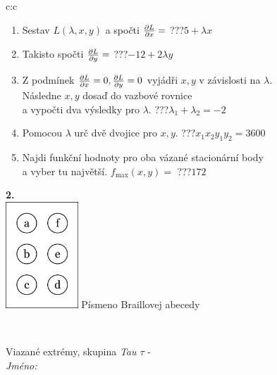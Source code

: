 \documentclass[10pt]{report}
\begin{document}
\begin{tabular}{c:c}
\begin{minipage}[c][104.5mm][t]{0.5\linewidth}
\begin{center}
\begin{minipage}{0.79\linewidth}
\begin{center}
\begin{varwidth}{\linewidth}
\begin{enumerate}
\item Sestav $L(\lambda,x,y)$ a spočti $\pdv{L}{x}=$\quad \dotfill\; ???\;\dotfill \quad $5+\lambda x$
\item Takisto spočti $\pdv{L}{y}=$\quad \dotfill\; ???\;\dotfill \quad $-12+2\lambda y$
\item Z podmínek $\pdv{L}{x}=0 , \pdv{L}{y}=0$ vyjádři $x,y$ v závislosti na $\lambda$.\\ \phantom{xxxxxx}Následne $x,y$ dosaď do vazbové rovnice\\ \phantom{xxxxxx}a vypočti dva výsledky pro $\lambda$.\quad \dotfill\; ???\;\dotfill \quad $\lambda_1+\lambda_2=-2$
\item Pomocou $\lambda$ urč dvě dvojice pro $x,y$.\quad \dotfill\; ???\;\dotfill \quad $x_1 x_2 y_1 y_2=3600$
\item Najdi funkční hodnoty pro oba vázané stacionární body\\ \phantom{xxxxxx}a vyber tu najvětší. $f_{\text{max}}(x,y)=$\quad \dotfill\; ???\;\dotfill \quad $172$
\end{enumerate}
\end{varwidth}
\end{center}
\end{minipage}
\begin{minipage}{0.20\linewidth}
\begin{center}
{\Huge\bfseries 2.} \\[2mm]
\includegraphics[height=40mm]{../images/braille.png}
{\small Písmeno Braillovej abecedy}
\end{center}
\end{minipage}
\end{center}
\end{minipage}
\\ \hdashline
\begin{minipage}[c][104.5mm][t]{0.5\linewidth}
\begin{center}
\vspace{7mm}
{\huge Viazané extrémy, skupina \textit{Tau $\tau$} -}\\[5mm]
\textit{Jméno:}\phantom{xxxxxxxxxxxxxxxxxxxxxxxxxxxxxxxxxxxxxxxxxxxxxxxxxxxxxxxxxxxxxxxxx}\\[5mm]

\end{center}
\end{minipage}
\end{tabular}
\end{document}
